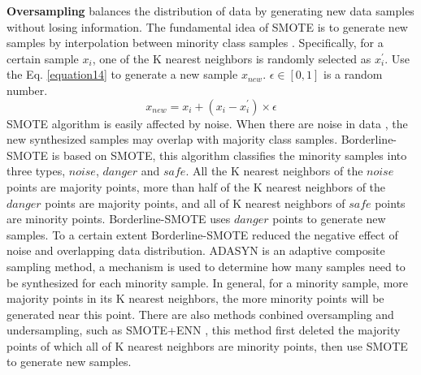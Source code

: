 \documentclass[ida]{iosart2x}
\begin{document}
\textbf{Oversampling} balances the distribution of data 
by generating new data samples without losing information.
The fundamental idea of SMOTE is to generate new samples by interpolation between minority class samples \cite{2018SMOTE}.
Specifically, for a certain sample $x_i$, one of the K nearest neighbors is randomly selected as $x_i ^{'}$.
Use the Eq. \ref{equation14} to generate a new sample $x_{new}$. $\epsilon \in [0,1]$ is a random number.
\begin{equation}
  \label{equation14}
  x_{new}=x_i+(x_i-x_i^{'})\times \epsilon
\end{equation}
 SMOTE algorithm is easily affected by noise.
When there are noise in data
, the new synthesized samples may overlap with majority class samples.
Borderline-SMOTE \cite{2005Borderline} is based on SMOTE, this algorithm classifies
the minority samples into three types, 
$noise$, $danger$ and $safe$.
All the K nearest neighbors of the $noise$ points are majority points, 
more than half of the K nearest neighbors 
of the $danger$ points are majority points, 
and all of K nearest neighbors of $safe$ points are minority points.
Borderline-SMOTE uses $danger$ points to generate new samples.
To a certain extent Borderline-SMOTE reduced the negative effect of noise and overlapping data distribution.
ADASYN \cite{2008ADASYN} is an adaptive composite sampling method, 
a mechanism is used to determine how many samples need to be synthesized for each minority sample.
In general, for a minority sample, more majority points in its K nearest neighbors, 
the more minority points will be generated near this point.
There are also methods conbined oversampling and undersampling, such as SMOTE+ENN \cite{2019Electrocardiogram},
this method first deleted the majority points of which all of K nearest neighbors are minority points,
then use SMOTE to generate new samples.
\end{document}

